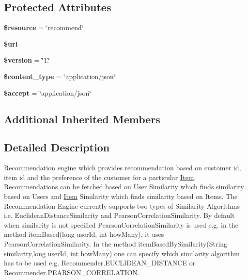 \subsection*{Protected Attributes}
\begin{DoxyCompactItemize}
\item 
\hypertarget{class_recommender_service_abd4c7b8b084214b8d2533ba07fce6b83}{{\bfseries \$resource} = \char`\"{}recommend\char`\"{}}\label{class_recommender_service_abd4c7b8b084214b8d2533ba07fce6b83}

\item 
\hypertarget{class_recommender_service_acf215f34a917d014776ce684a9ee8909}{{\bfseries \$url}}\label{class_recommender_service_acf215f34a917d014776ce684a9ee8909}

\item 
\hypertarget{class_recommender_service_a17c8948c68aa44fa9961ae169b6a8961}{{\bfseries \$version} = \char`\"{}1.\char`\"{}}\label{class_recommender_service_a17c8948c68aa44fa9961ae169b6a8961}

\item 
\hypertarget{class_recommender_service_ae754d6373f275e781f47c8bc9b994b6d}{{\bfseries \$content\+\_\+type} = \char`\"{}application/json\char`\"{}}\label{class_recommender_service_ae754d6373f275e781f47c8bc9b994b6d}

\item 
\hypertarget{class_recommender_service_a75fc18c4ff06288ff9fdf8aba9bd1081}{{\bfseries \$accept} = \char`\"{}application/json\char`\"{}}\label{class_recommender_service_a75fc18c4ff06288ff9fdf8aba9bd1081}

\end{DoxyCompactItemize}
\subsection*{Additional Inherited Members}


\subsection{Detailed Description}
Recommendation engine which provides recommendation based on customer id, item id and the preference of the customer for a particular \hyperlink{class_item}{Item}. Recommendations can be fetched based on \hyperlink{class_user}{User} Similarity which finds similarity based on Users and \hyperlink{class_item}{Item} Similarity which finds similarity based on Items. The Recommendation Engine currently supports two types of Similarity Algorithms i.\+e. Euclidean\+Distance\+Similarity and Pearson\+Correlation\+Similarity. By default when similarity is not specified Pearson\+Correlation\+Similarity is used e.\+g. in the method item\+Based(long user\+Id, int how\+Many), it uses Pearson\+Correlation\+Similarity. In the method item\+Based\+By\+Similarity(String similarity,long user\+Id, int how\+Many) one can specify which similarity algorithm has to be used e.\+g. Recommender.\+E\+U\+C\+L\+I\+D\+E\+A\+N\+\_\+\+D\+I\+S\+T\+A\+N\+C\+E or Recommender.\+P\+E\+A\+R\+S\+O\+N\+\_\+\+C\+O\+R\+R\+E\+L\+A\+T\+I\+O\+N.

